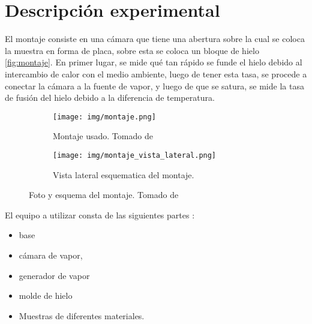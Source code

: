 \section{Descripción experimental}

El montaje consiste en una cámara que tiene una abertura sobre la cual se coloca la muestra en forma de placa, sobre esta se coloca un bloque de hielo \ref{fig:montaje}. En primer lugar, se mide qué tan rápido se funde el hielo debido al intercambio de calor con el medio ambiente, luego de tener esta tasa, se procede a conectar la cámara a la fuente de vapor, y luego de que se satura, se mide la tasa de fusión del hielo debido a la diferencia de temperatura.


\begin{figure}[t]
    \centering
    \begin{subfigure}[b]{0.45\textwidth}
        \centering
        \texttt{[image: img/montaje.png]}
        \caption{Montaje usado. Tomado de  \cite{conductividad_notas}}
        \label{fig:montaje_a}
    \end{subfigure}
    \begin{subfigure}[b]{0.45\textwidth}
        \centering
        \texttt{[image: img/montaje\_vista\_lateral.png]}
        \caption{Vista lateral esquematica del montaje. }
        \label{fig:montaje_b}
    \end{subfigure}
    \caption{Foto y esquema del montaje. Tomado de  \cite{conductividad_notas}}
\end{figure}
El equipo a utilizar consta de las siguientes partes \cite{conductividad_notas}:
\begin{itemize}
    \item base
    \item cámara de vapor,
    \item generador de vapor
    \item molde de hielo
    \item Muestras de diferentes materiales.
\end{itemize}